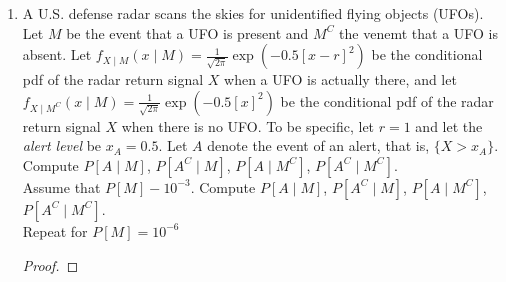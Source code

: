 \documentclass[paper=usletter, fontsize=12pt]{article}
\begin{document}
\begin{enumerate}
\begin{proof}
            And,
            \begin{align*}
                f_Y(y) & = \int_{\infty}f_{X,Y}(x,y)\diff{x}\\
                & = \int_{\infty}f_{Y \mid X}(y \mid x)f_X(x)\diff{x}\\
                & = \int_{-1}^{1}\frac{1}{2}\frac{1}{\sqrt{2\pi\sigma^2}}\exp\Big(\frac{-(y-x)^2}{2\sigma^2}\Big)\diff{x}\\
                & = \frac{1}{2}\bigg(\phi\Big(\frac{y-1}{\sigma}\Big)-\phi\Big(\frac{y+1}{\sigma}\Big)\bigg)
            \end{align*}
            \endgroup

            Therefore,
            \begin{align*}
                f_{X \mid Y}(x \mid y) & = \frac{f_{Y \mid X}(y \mid x)f_X(x)}{f_Y(y)}\\
                & = \frac{\frac{1}{\sqrt{2\pi\sigma^2}}\exp\Big(\frac{-(y-x)^2}{2\sigma^2}\Big)f_X(x)}{\phi\Big(\frac{y-1}{\sigma}\Big)-\phi\Big(\frac{y+1}{\sigma}\Big)} \qedhere
            \end{align*}
            \endgroup

        \end{proof}

        \item A U.S. defense radar scans the skies for unidentified flying
        objects (UFOs). Let $M$ be the event that a UFO is present and $M^C$
        the venemt that a UFO is absent. Let $f_{X \mid M}(x \mid
        M)=\frac{1}{\sqrt{2\pi}}\exp(-0.5[x-r]^2)$ be the conditional pdf of
        the radar return signal $X$ when a UFO is actually there, and let $f_{X
        \mid M^C}(x \mid M)=\frac{1}{\sqrt{2\pi}}\exp(-0.5[x]^2)$ be the
        conditional pdf of the radar return signal $X$ when there is no UFO. To
        be specific, let $r=1$ and let the \textit{alert level} be $x_A=0.5$.
        Let $A$ denote the event of an alert, that is, $\{X>x_A\}$. Compute
        $P[A\mid M]$, $P[A^C\mid M]$, $P[A\mid M^C]$, $P[A^C\mid M^C]$.\\
        Assume that $P[M]-10^{-3}$. Compute $P[A\mid M]$, $P[A^C\mid M]$,
        $P[A\mid M^C]$, $P[A^C\mid M^C]$.\\
        Repeat for $P[M]=10^{-6}$
        \begin{proof}
        \end{proof}

    \end{enumerate}
\end{document}
